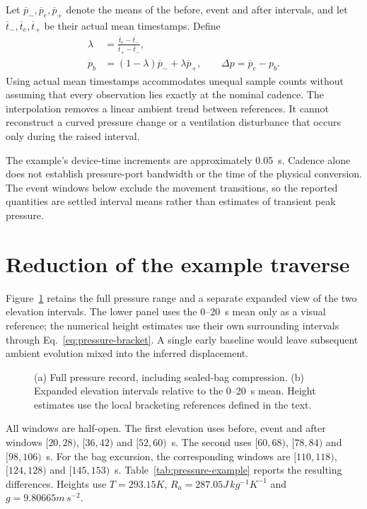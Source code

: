 Let $\overline p_-,\overline p_e,\overline p_+$ denote the means of the before, event and after intervals, and let $\overline t_-,\overline t_e,\overline t_+$ be their actual mean timestamps. Define
\begin{align}
 \lambda&=\frac{\overline t_e-\overline t_-}{\overline t_+-\overline t_-},\\
 p_b&=(1-\lambda)\overline p_-+\lambda\overline p_+,\qquad
 \Delta p=\overline p_e-p_b.
 \label{eq:pressure-bracket}
\end{align}
Using actual mean timestamps accommodates unequal sample counts without assuming that every observation lies exactly at the nominal cadence. The interpolation removes a linear ambient trend between references. It cannot reconstruct a curved pressure change or a ventilation disturbance that occurs only during the raised interval.

The example's device-time increments are approximately 0.05~s. Cadence alone does not establish pressure-port bandwidth or the time of the physical conversion. The event windows below exclude the movement transitions, so the reported quantities are settled interval means rather than estimates of transient peak pressure.

\section{Reduction of the example traverse}
Figure~\ref{fig:pressure-example} retains the full pressure range and a separate expanded view of the two elevation intervals. The lower panel uses the 0--20~s mean only as a visual reference; the numerical height estimates use their own surrounding intervals through Eq.~\eqref{eq:pressure-bracket}. A single early baseline would leave subsequent ambient evolution mixed into the inferred displacement.

\begin{figure}[t]
\centering

\caption{(a) Full pressure record, including sealed-bag compression. (b) Expanded elevation intervals relative to the 0--20~s mean. Height estimates use the local bracketing references defined in the text.}
\label{fig:pressure-example}
\end{figure}

All windows are half-open. The first elevation uses before, event and after windows $[20,28)$, $[36,42)$ and $[52,60)$~s. The second uses $[60,68)$, $[78,84)$ and $[98,106)$~s. For the bag excursion, the corresponding windows are $[110,118)$, $[124,128)$ and $[145,153)$~s. Table~\ref{tab:pressure-example} reports the resulting differences. Heights use $T=293.15\unit{K}$, $R_a=287.05\unit{J\,kg^{-1}K^{-1}}$ and $g=9.80665\unit{m\,s^{-2}}$.

